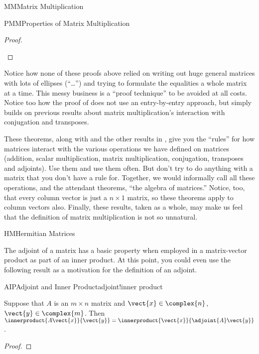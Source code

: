 \begin{subsect}{MM}{Matrix Multiplication}
\begin{subsect}{PMM}{Properties of Matrix Multiplication}
\begin{proof}
\begin{para}
\end{para}
%
\end{proof}
%
\begin{para}Notice how none of these proofs above relied on writing out huge general matrices with lots of ellipses (``\dots'') and trying to formulate the equalities a whole matrix at a time.  This messy business is a ``proof technique'' to be avoided at all costs.  Notice too how the proof of  does not use an entry-by-entry approach, but simply builds on previous results about matrix multiplication's interaction with conjugation and transposes.\end{para}
%
\begin{para}These theorems, along with  and the other results in , give you the ``rules'' for how matrices interact with the various operations we have defined on matrices (addition, scalar multiplication, matrix multiplication, conjugation, transposes and adjoints).  Use them and use them often.  But don't try to do anything with a matrix that you don't have a rule for.  Together, we would informally call all these operations, and the attendant theorems, ``the algebra of matrices.''  Notice, too, that every column vector is just a $n\times 1$ matrix, so these theorems apply to column vectors also.  Finally, these results, taken as a whole, may make us feel that the definition of matrix multiplication is not so unnatural.\end{para}
%
%
\end{subsect}
%
\begin{subsect}{HM}{Hermitian Matrices}
%
\begin{para}The adjoint of a matrix has a basic property when employed in a matrix-vector product as part of an inner product.  At this point, you could even use the following result as a motivation for the definition of an adjoint.\end{para}
%
\begin{theorem}{AIP}{Adjoint and Inner Product}{adjoint!inner product}
\begin{para}Suppose that $A$ is an $m\times n$ matrix and $\vect{x}\in\complex{n}$, $\vect{y}\in\complex{m}$.  Then $\innerproduct{A\vect{x}}{\vect{y}}=\innerproduct{\vect{x}}{\adjoint{A}\vect{y}}$.\end{para}
\end{theorem}
%
\begin{proof}

\end{proof}
\end{subsect}
\end{subsect}
